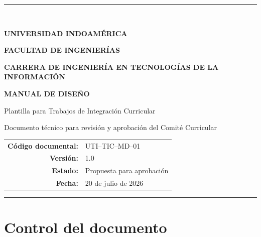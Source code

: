 \documentclass[12pt,a4paper,oneside]{report}
\begin{document}
\hypersetup{pageanchor=false}

\begin{titlepage}
  \thispagestyle{empty}
  \begin{center}
    \vspace*{1.5cm}
    {\color{UTIMorado}\rule{\textwidth}{2pt}}\\[1.2cm]
    {\Large\bfseries UNIVERSIDAD INDOAMÉRICA\par}
    \vspace{0.5cm}
    {\large\bfseries FACULTAD DE INGENIERÍAS\par}
    \vspace{0.3cm}
    {\large\bfseries CARRERA DE INGENIERÍA EN TECNOLOGÍAS DE LA INFORMACIÓN\par}
    \vfill
    {\Huge\bfseries\color{UTIMorado} MANUAL DE DISEÑO\par}
    \vspace{0.5cm}
    {\LARGE Plantilla para Trabajos de Integración Curricular\par}
    \vspace{1cm}
    {\large Documento técnico para revisión y aprobación del Comité Curricular\par}
    \vfill
    \begin{tabular}{rl}
      \textbf{Código documental:} & UTI--TIC--MD--01 \\
      \textbf{Versión:} & 1.0 \\
      \textbf{Estado:} & Propuesta para aprobación \\
      \textbf{Fecha:} & 20 de julio de 2026 \\
    \end{tabular}
    \vfill
    {\color{UTINaranja}\rule{\textwidth}{2pt}}
  \end{center}
\end{titlepage}

\hypersetup{pageanchor=true}

\chapter*{Control del documento}
\end{document}
